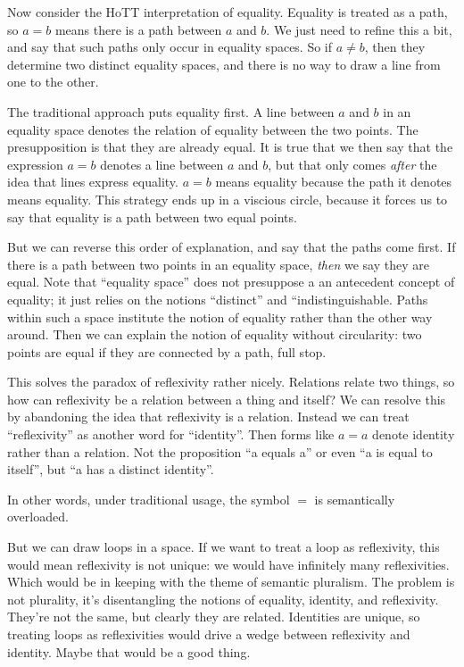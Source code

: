 Now consider the HoTT interpretation of equality. Equality is treated
as a path, so \(a=b\) means there is a path between \(a\) and \(b\).
We just need to refine this a bit, and say that such paths only occur
in equality spaces. So if \(a\neq b\), then they determine two
distinct equality spaces, and there is no way to draw a line from one
to the other.

The traditional approach puts equality first. A line between \(a\) and
\(b\) in an equality space denotes the relation of equality between
the two points. The presupposition is that they are already equal. It
is true that we then say that the expression \(a=b\) denotes a line
between \(a\) and \(b\), but that only comes \textit{after} the idea
that lines express equality. \(a=b\) means equality because the path
it denotes means equality. This strategy ends up in a viscious circle,
because it forces us to say that equality is a path between two equal
points.

But we can reverse this order of explanation, and say that the paths
come first. If there is a path between two points in an equality
space, \textit{then} we say they are equal. Note that ``equality
space'' does not presuppose a an antecedent concept of equality; it
just relies on the notions ``distinct'' and ``indistinguishable. Paths
within such a space institute the notion of equality rather than the
other way around. Then we can explain the notion of equality without
circularity: two points are equal if they are connected by a path,
full stop.

This solves the paradox of reflexivity rather nicely. Relations relate
two things, so how can reflexivity be a relation between a thing and
itself? We can resolve this by abandoning the idea that reflexivity is
a relation. Instead we can treat ``reflexivity'' as another word for
``identity''. Then forms like \(a=a\) denote identity rather than a
relation. Not the proposition ``a equals a'' or even ``a is equal to
itself'', but ``a has a distinct identity''.

In other words, under traditional usage, the symbol \(=\) is
semantically overloaded.

But we can draw loops in a space. If we want to treat a loop as
reflexivity, this would mean reflexivity is not unique: we would have
infinitely many reflexivities. Which would be in keeping with the
theme of semantic pluralism. The problem is not plurality, it's
disentangling the notions of equality, identity, and reflexivity.
They're not the same, but clearly they are related. Identities are
unique, so treating loops as reflexivities would drive a wedge between
reflexivity and identity. Maybe that would be a good thing.


